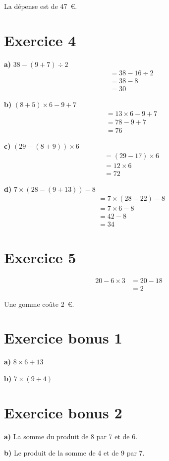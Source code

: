 \documentclass[12pt]{extarticle}
\begin{document}
La dépense est de 47~€.

\section*{Exercice 4}

\textbf{a)} $38 - (9 + 7) \div 2$
\begin{align*}
&= 38 - 16 \div 2 \\
&= 38 - 8 \\
&= 30
\end{align*}

\textbf{b)} $(8 + 5) \times 6 - 9 + 7$
\begin{align*}
&= 13 \times 6 - 9 + 7 \\
&= 78 - 9 + 7 \\
&= 76
\end{align*}

\textbf{c)} $(29 - (8 + 9)) \times 6$
\begin{align*}
&= (29 - 17) \times 6 \\
&= 12 \times 6 \\
&= 72
\end{align*}

\textbf{d)} $7 \times (28 - (9 + 13)) - 8$
\begin{align*}
&= 7 \times (28 - 22) - 8 \\
&= 7 \times 6 - 8 \\
&= 42 - 8 \\
&= 34
\end{align*}

\section*{Exercice 5}
\begin{align*}
20 - 6 \times 3 &= 20 - 18 \\
                &= 2
\end{align*}

Une gomme coûte 2~€.

\section*{Exercice bonus 1}

\textbf{a)} $8 \times 6 + 13$

\textbf{b)} $7 \times (9 + 4)$

\section*{Exercice bonus 2}

\textbf{a)} La somme du produit de 8 par 7 et de 6.

\textbf{b)} Le produit de la somme de 4 et de 9 par 7.
\end{document}
